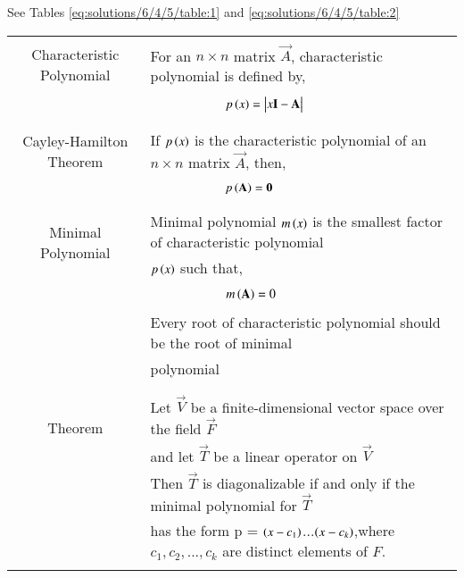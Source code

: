 See Tables \ref{eq:solutions/6/4/5/table:1} and \ref{eq:solutions/6/4/5/table:2}
%
\begin{table*}[ht!]
\centering
\begin{tabular}{|c|l|}
    \hline
	\multirow{3}{*}{Characteristic Polynomial} 
	& \\
	& For an $n\times n$ matrix $\vec{A}$, characteristic polynomial is defined by,\\
	&\\
	& $\qquad\qquad\qquad p\brak{x}=\mydet{x\Vec{I}-\Vec{A}}$\\
	&\\
	\hline
	\multirow{3}{*}{Cayley-Hamilton Theorem}
    &\\
    & If $p\left(x\right)$ is the characteristic polynomial of an $n\times n$ matrix $\vec{A}$, then,\\
    &\\
    &$\qquad \qquad \qquad p\left(\mathbf{A}\right)=\mathbf{0}$\\
    &\\
    \hline
	\multirow{3}{*}{Minimal Polynomial} 
	&\\
	& Minimal polynomial $m\left(x\right)$ is the smallest factor of characteristic polynomial\\
	& $p\left(x\right)$ such that,\\
	&\\
	& $\qquad \qquad \qquad m\left(\mathbf{A}\right)=0$\\
	& \\
	& Every root of characteristic polynomial should be the root of minimal\\
	& polynomial\\
	&\\
    \hline
    \multirow{3}{*}{Theorem} 
	&\\
	& Let $\vec{V}$ be a finite-dimensional vector space over the field $\vec{F}$ \\
	& and let $\vec{T}$ be a linear operator on $\vec{V}$\\
	& Then $\vec{T}$ is diagonalizable if and only if the minimal polynomial for $\Vec{T}$\\
	& has the form p = $\left(x-c_1\right)$...$\left(x-c_k\right)$,where $c_1,c_2,...,c_k$ are distinct elements of $F$. \\
	&\\
    \hline
\end{tabular}
    \caption{Definitions}
\label{eq:solutions/6/4/5/table:1}
\end{table*}
\onecolumn
